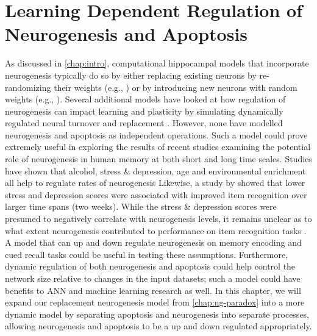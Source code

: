\chapter{Learning Dependent Regulation of Neurogenesis and Apoptosis}
\label{chap:learn-dep-ng}

As discussed in \cref{chap:intro}, computational hippocampal models 
that incorporate neurogenesis typically do so by
either replacing existing neurons by re-randomizing their weights 
(e.g., \cite{replacement_neurogenesis,chambers-potenza-hoffman-miranker-04}) 
or by introducing new neurons with random weights (e.g., \cite{additive_neurogenesis,weisz-argibay-2012}).
Several additional models have looked at how regulation of neurogenesis can impact learning and plasticity 
by simulating dynamically regulated neural turnover and replacement
\citep{deisseroth-singla-toda-monje-palmer-malenka-04,apoptosis-neurogenesis-hebbian-networks,chambers-conroy-07}.
However, none have modelled neurogenesis and apoptosis as independent operations.
Such a model could prove 
extremely useful in exploring the results of recent 
studies examining the potential role 
of neurogenesis in human memory at both short and long time scales. 
Studies have shown that alcohol, stress \& depression, age 
and environmental enrichment all help to regulate rates of 
neurogenesis 
\citep{origin_of_microneurons, enrichment-and-activity-dependent-regulation-of-neurogenesis, 
enrichment-dependent-regulation-of-neurogenesis}
Likewise, a study by \citet{dery-goldstein-becker-15} showed that 
lower stress and depression scores 
were associated with improved item 
recognition over larger time spans (two weeks). 
While the stress \& depression scores were presumed to 
negatively correlate with neurogenesis levels, it remains unclear as to what extent 
neurogenesis contributed to performance on item 
recognition tasks \citep{dery-goldstein-becker-15}.
A model that can up and down regulate neurogenesis on 
memory encoding and cued recall tasks could be useful in testing 
these assumptions.
Furthermore, dynamic regulation of both neurogenesis and apoptosis could help
control the network size relative to changes in the input datasets; 
such a model could have benefits to \ac{ANN} and machine learning research as well.
In this chapter, we will expand our replacement neurogenesis model from \cref{chap:ng-paradox} 
into a more dynamic model by separating apoptosis and neurogenesis into separate processes,
allowing neurogenesis and apoptosis to be a up and down regulated appropriately.

